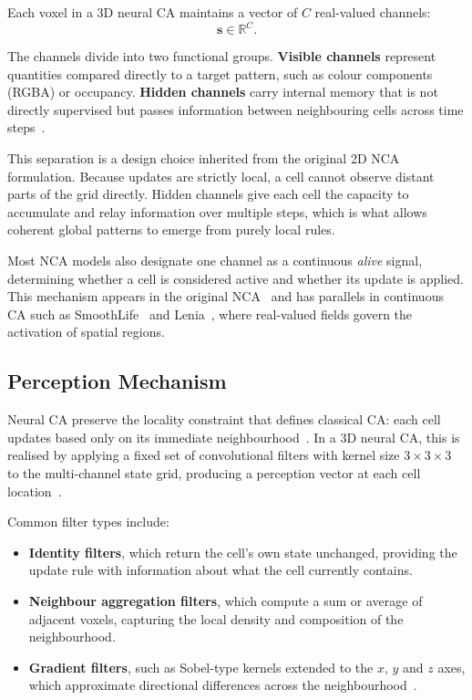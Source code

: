 Each voxel in a 3D neural CA maintains a vector of $C$ real-valued channels:
\[
    \mathbf{s} \in \mathbb{R}^{C}.
\]

The channels divide into two functional groups. \textbf{Visible channels} represent
quantities compared directly to a target pattern, such as colour components (RGBA) or
occupancy. \textbf{Hidden channels} carry internal memory that is not directly
supervised but passes information between neighbouring cells across time
steps~\cite{Mordvintsev2020}.

This separation is a design choice inherited from the original 2D NCA formulation.
Because updates are strictly local, a cell cannot observe distant parts of the grid
directly. Hidden channels give each cell the capacity to accumulate and relay
information over multiple steps, which is what allows coherent global patterns to
emerge from purely local rules.

Most NCA models also designate one channel as a continuous \emph{alive} signal,
determining whether a cell is considered active and whether its update is applied.
This mechanism appears in the original NCA~\cite{Mordvintsev2020} and has parallels
in continuous CA such as SmoothLife~\cite{Rafler2011} and Lenia~\cite{Chan2019},
where real-valued fields govern the activation of spatial regions.

\subsection{Perception Mechanism}

Neural CA preserve the locality constraint that defines classical CA: each cell updates
based only on its immediate neighbourhood~\cite{IlachinskiCellular, Wolfram2002}. In
a 3D neural CA, this is realised by applying a fixed set of convolutional filters with
kernel size $3 \times 3 \times 3$ to the multi-channel state grid, producing a
perception vector at each cell location~\cite{Mordvintsev2020, Sudhakaran2021}.

Common filter types include:
\begin{itemize}
    \item \textbf{Identity filters}, which return the cell's own state unchanged,
    providing the update rule with information about what the cell currently contains.
    \item \textbf{Neighbour aggregation filters}, which compute a sum or average of
    adjacent voxels, capturing the local density and composition of the neighbourhood.
    \item \textbf{Gradient filters}, such as Sobel-type kernels extended to the $x$,
    $y$ and $z$ axes, which approximate directional differences across the
    neighbourhood~\cite{Mordvintsev2020, Sudhakaran2021}.
\end{itemize}


